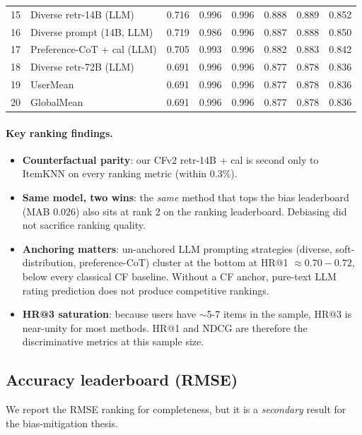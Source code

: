\documentclass[11pt,a4paper]{article}
\begin{document}
\begin{table}[H]
\begin{tabularx}{\linewidth}{lXcccccc}
15 & Diverse retr-14B (LLM)                   & 0.716 & 0.996 & 0.996 & 0.888 & 0.889 & 0.852 \\
16 & Diverse prompt (14B, LLM)                & 0.719 & 0.986 & 0.996 & 0.887 & 0.888 & 0.850 \\
17 & Preference-CoT + cal (LLM)               & 0.705 & 0.993 & 0.996 & 0.882 & 0.883 & 0.842 \\
18 & Diverse retr-72B (LLM)                   & 0.691 & 0.996 & 0.996 & 0.877 & 0.878 & 0.836 \\
19 & UserMean                                 & 0.691 & 0.996 & 0.996 & 0.877 & 0.878 & 0.836 \\
20 & GlobalMean                               & 0.691 & 0.996 & 0.996 & 0.877 & 0.878 & 0.836 \\
\bottomrule
\end{tabularx}
\end{table}

\paragraph{Key ranking findings.}
\begin{itemize}[leftmargin=1.5em,itemsep=1pt]
\item \textbf{Counterfactual parity}: our CFv2 retr-14B + cal is second
      only to ItemKNN on every ranking metric (within $0.3\%$).
\item \textbf{Same model, two wins}: the \emph{same} method that tops the
      bias leaderboard (MAB $0.026$) also sits at rank 2 on the ranking
      leaderboard. Debiasing did not sacrifice ranking quality.
\item \textbf{Anchoring matters}: un-anchored LLM prompting strategies
      (diverse, soft-distribution, preference-CoT) cluster at the bottom
      at HR@1 $\approx 0.70{-}0.72$, below every classical CF baseline.
      Without a CF anchor, pure-text LLM rating prediction does not
      produce competitive rankings.
\item \textbf{HR@3 saturation}: because users have $\sim$5-7 items in the
      sample, HR@3 is near-unity for most methods. HR@1 and NDCG are
      therefore the discriminative metrics at this sample size.
\end{itemize}

\subsection{Accuracy leaderboard (RMSE)}
We report the RMSE ranking for completeness, but it is a \emph{secondary}
result for the bias-mitigation thesis.
\end{document}
